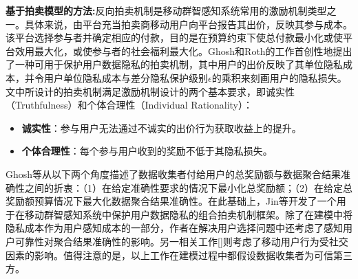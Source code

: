 \textbf{基于拍卖模型的方法:}反向拍卖机制是移动群智感知系统常用的激励机制类型之一。具体来说，由平台充当拍卖商移动用户向平台报告其出价，反映其参与成本。该平台选择参与者并确定相应的付款，目的是在预算约束下使总付款最小化或使平台效用最大化，或使参与者的社会福利最大化\cite{DejunJ}。Ghosh和Roth的工作\cite{ghosh2015selling}首创性地提出了一种可用于保护用户数据隐私的拍卖机制，其中用户的出价反映了其单位隐私成本，并令用户单位隐私成本与差分隐私保护级别$\epsilon$的乘积来刻画用户的隐私损失。文中所设计的拍卖机制满足激励机制设计的两个基本要求，即诚实性（Truthfulness）和个体合理性（Individual Rationality）：
\begin{itemize}
\item \textbf{诚实性}：参与用户无法通过不诚实的出价行为获取收益上的提升。
\item \textbf{个体合理性}：每个参与用户收到的奖励不低于其隐私损失。
\end{itemize}
Ghosh等\cite{ghosh2015selling}从以下两个角度描述了数据收集者付给用户的总奖励额与数据聚合结果准确性之间的折衷：（1）在给定准确性要求的情况下最小化总奖励额；（2）在给定总奖励额预算情况下最大化数据聚合结果准确性。在此基础上，Jin等\cite{jin2016inception}开发了一个用于在移动群智感知系统中保护用户数据隐私的组合拍卖机制框架。除了在建模中将隐私成本作为用户感知成本的一部分，作者在解决用户选择问题中还考虑了感知用户可靠性对聚合结果准确性的影响。另一相关工作[]则考虑了移动用户行为受社交因素的影响。值得注意的是，以上工作在建模过程中都假设数据收集者为可信第三方。

